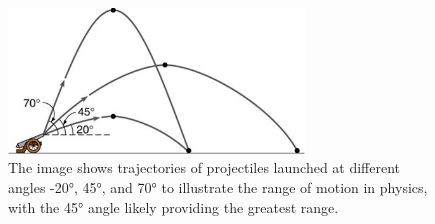 \documentclass[12pt, titlepage]{article}
\begin{document}
\begin{figure}[H]
\centering
\includegraphics[width=0.7\textwidth]{fig5.jpg}
\caption{The image shows trajectories of projectiles launched at different angles -20°, 45°, and 70° to illustrate the range of motion in physics, with the 45° angle likely providing the greatest range.}
\label{Fig:fig5}
\end{figure}
\end{document}
